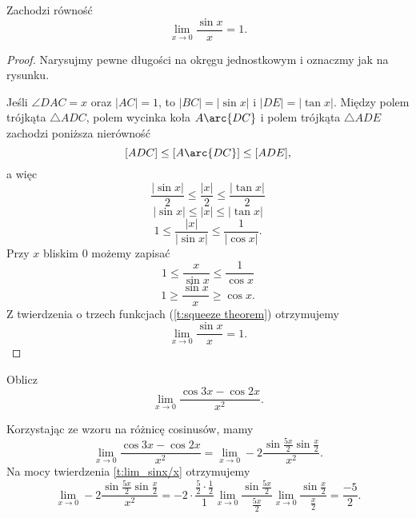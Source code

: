 \begin{theorem}
    \label{t:lim_sinx/x}
    Zachodzi równość
    \[ \lim_{x \to 0}\frac{\sin{x}}{x} = 1. \]
\end{theorem}
\begin{proof}
    Narysujmy pewne długości na okręgu jednostkowym i oznaczmy jak na rysunku.
    \begin{center}
    \end{center}
    Jeśli $\angle DAC = x$ oraz $|AC| = 1$, to $|BC| = |\sin x|$ i $|DE| = |\tan x|$. Między polem trójkąta $\triangle ADC$, polem wycinka koła $A\arc{DC}$ i polem trójkąta $\triangle ADE$ zachodzi poniższa nierówność
    \[ [ADC] \leq [A\arc{DC}] \leq [ADE], \]
    a więc
    \[ \frac{|\sin x|}{2} \leq \frac{|x|}{2} \leq \frac{|\tan x|}{2} \]
    \[ |\sin x| \leq |x| \leq |\tan x| \]
    \[ 1 \leq \frac{|x|}{|\sin{x}|} \leq \frac{1}{|\cos x|}. \]
    Przy $x$ bliskim $0$ możemy zapisać
    \[ 1 \leq \frac{x}{\sin{x}} \leq \frac{1}{\cos x} \]
    \[ 1 \geq \frac{\sin{x}}{x} \geq \cos x. \]
    Z twierdzenia o trzech funkcjach (\ref{t:squeeze theorem}) otrzymujemy
    \[ \lim_{x \to 0} \frac{\sin{x}}{x} = 1. \]
\end{proof}

\begin{example}
    Oblicz
    \[ \lim_{x \to 0} \frac{\cos{3x} - \cos{2x}}{x^2}. \]
\end{example}
\begin{solution}
    Korzystając ze wzoru na różnicę cosinusów, mamy
    \[ \lim_{x \to 0} \frac{\cos{3x} - \cos{2x}}{x^2} = \lim_{x \to 0} -2\frac{\sin\frac{5x}{2}\sin\frac{x}{2}}{x^2}. \]
    Na mocy twierdzenia \ref{t:lim_sinx/x} otrzymujemy
    \[ \lim_{x \to 0} -2\frac{\sin\frac{5x}{2}\sin\frac{x}{2}}{x^2} = -2\cdot\frac{\frac{5}{2}\cdot\frac{1}{2}}{1}\lim_{x\to 0}\frac{\sin\frac{5x}{2}}{\frac{5x}{2}}\lim_{x\to 0}\frac{\sin\frac{x}{2}}{\frac{x}{2}} =  \frac{-5}{2}. \]
\end{solution}

